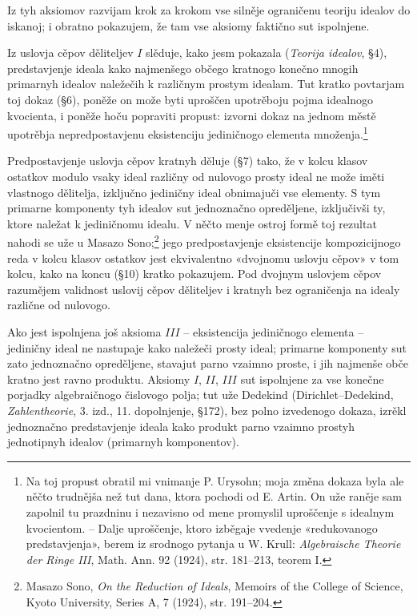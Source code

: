 \documentclass[11pt]{article}
\begin{document}
Iz tyh aksiomov razvijam krok za krokom vse silněje ograničenu teoriju idealov do iskanoj; i obratno pokazujem, že tam vse aksiomy faktično sut ispolnjene.

Iz uslovja cěpov děliteljev $I$ slěduje, kako jesm pokazala (\emph{Teorija idealov}, §4), predstavjenje ideala kako najmenšego občego kratnogo konečno mnogih primarnyh idealov naležečih k različnym prostym idealam. Tut kratko povtarjam toj dokaz (§6), poněže on može byti uproščen upotrěboju pojma idealnogo kvocienta, i poněže hoču popraviti propust: izvorni dokaz na jednom městě upotrěbja nepredpostavjenu eksistenciju jediničnogo elementa množenja.\footnote{Na toj propust obratil mi vnimanje P. Urysohn; moja změna dokaza byla ale něčto trudnějša než tut dana, ktora pochodi od E. Artin. On uže raněje sam zapolnil tu prazdninu i nezavisno od mene promyslil uproščenje s idealnym kvocientom. -- Dalje uproščenje, ktoro izběgaje vvedenje «redukovanogo predstavjenja», berem iz srodnogo pytanja u W. Krull: \emph{Algebraische Theorie der Ringe III}, Math. Ann. 92 (1924), str. 181--213, teorem I.}

Predpostavjenje uslovja cěpov kratnyh děluje (§7) tako, že v kolcu klasov ostatkov modulo vsaky ideal različny od nulovogo prosty ideal ne može iměti vlastnogo dělitelja, izključno jediničny ideal obnimajuči vse elementy. S tym primarne komponenty tyh idealov sut jednoznačno opreděljene, izključivši ty, ktore naležat k jediničnomu idealu. V něčto menje ostroj formě toj rezultat nahodi se uže u Masazo Sono;\footnote{Masazo Sono, \emph{On the Reduction of Ideals}, Memoirs of the College of Science, Kyoto University, Series A, 7 (1924), str. 191--204.} jego predpostavjenje eksistencije kompozicijnogo reda v kolcu klasov ostatkov jest ekvivalentno «dvojnomu uslovju cěpov» v tom kolcu, kako na koncu (§10) kratko pokazujem. Pod dvojnym uslovjem cěpov razumějem validnost uslovij cěpov děliteljev i kratnyh bez ograničenja na idealy različne od nulovogo.

Ako jest ispolnjena još aksioma $III$ -- eksistencija jediničnogo elementa -- jediničny ideal ne nastupaje kako naležeči prosty ideal; primarne komponenty sut zato jednoznačno opreděljene, stavajut parno vzaimno proste, i jih najmenše obče kratno jest ravno produktu. Aksiomy $I$, $II$, $III$ sut ispolnjene za vse konečne porjadky algebraičnogo čislovogo polja; tut uže Dedekind (Dirichlet--Dedekind, \emph{Zahlentheorie}, 3. izd., 11. dopolnjenje, §172), bez polno izvedenogo dokaza, izrěkl jednoznačno predstavjenje ideala kako produkt parno vzaimno prostyh jednotipnyh idealov (primarnyh komponentov).
\end{document}
